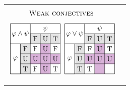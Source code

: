 \documentclass[xcolor=x11names]{beamer}
\begin{document}
\begin{frame}
\begin{tabular}{cc}
\begin{minipage}{5.2cm}
\[\textsc{Weak conjectives}\]
\[\begin{tikzpicture}[scale=.5]
\begin{scope}[violet!30]
\fill  (2,-1) rectangle (3,-4);
\fill  (1,-2) rectangle (4,-3);
\end{scope}
\node at (0,0){};
\draw [step=1cm] (-1,-4) node (v1) {} grid (4,1);
\draw[fill=white]  (v1) rectangle (0,-1);
\draw[fill=white]  (-1,1) rectangle (1,-1) node (v2) {};
\draw[fill=white]  (1,1) rectangle (4,0);
\draw[fill=black, opacity=.1]  (v2) node (v3) {} rectangle (4,0);
\draw[fill=black, opacity=.1]  (v3) rectangle (0,-4);
\node at (0,0) {$\varphi\land \psi$};
\node at (-0.5,-2.5) {$\varphi$};
\node at (2.5,0.5) {$\psi$};
\node at (0.5,-1.5) {F};
\node at (0.5,-2.5) {U};
\node at (0.5,-3.5) {T};
\node at (1.5,-0.5) {F};
\node at (2.5,-0.5) {U};
\node at (3.5,-0.5) {T};
\node at (1.5,-1.5) {F};
\node at (2.5,-1.5) {U};
\node at (3.5,-1.5) {F};
\node at (1.5,-2.5) {U};
\node at (2.5,-2.5) {U};
\node at (3.5,-2.5) {U};
\node at (1.5,-3.5) {F};
\node at (2.5,-3.5) {U};
\node at (3.5,-3.5) {T};
\end{tikzpicture}
\; %
\begin{tikzpicture}[scale=.5]
\begin{scope}[violet!30]
\fill  (2,-1) rectangle (3,-4);
\fill  (1,-2) rectangle (4,-3);
\end{scope}
\node at (0,0){};
\draw [step=1cm] (-1,-4) node (v1) {} grid (4,1);
\draw[fill=white]  (v1) rectangle (0,-1);
\draw[fill=white]  (-1,1) rectangle (1,-1) node (v2) {};
\draw[fill=white]  (1,1) rectangle (4,0);
\draw[fill=black, opacity=.1]  (v2) node (v3) {} rectangle (4,0);
\draw[fill=black, opacity=.1]  (v3) rectangle (0,-4);
\node at (0,0) {$\varphi\lor \psi$};
\node at (-0.5,-2.5) {$\varphi$};
\node at (2.5,0.5) {$\psi$};
\node at (0.5,-1.5) {F};
\node at (0.5,-2.5) {U};
\node at (0.5,-3.5) {T};
\node at (1.5,-0.5) {F};
\node at (2.5,-0.5) {U};
\node at (3.5,-0.5) {T};
\node at (1.5,-1.5) {F};
\node at (2.5,-1.5) {U};
\node at (3.5,-1.5) {T};
\node at (1.5,-2.5) {U};
\node at (2.5,-2.5) {U};
\node at (3.5,-2.5) {U};
\node at (1.5,-3.5) {T};

\end{tikzpicture}\]
\end{minipage}
\end{tabular}
\end{frame}
\end{document}
